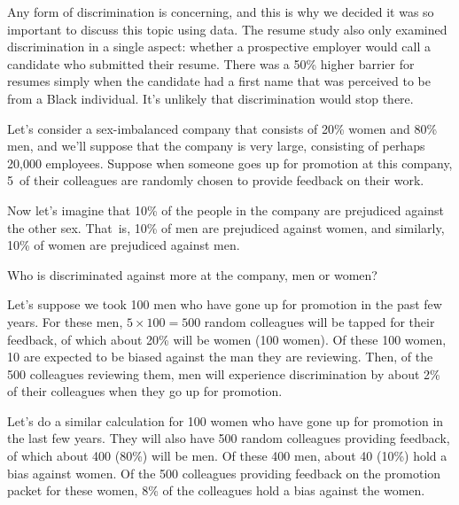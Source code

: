 Any form of discrimination is concerning,
and this is why we decided it was so important to discuss
this topic using data.
The resume study also only examined discrimination in a
single aspect: whether a prospective employer would
call a candidate who submitted their resume.
There was a 50\% higher barrier for resumes simply when
the candidate had a first name that was perceived to be
from a Black individual.
It's unlikely that discrimination would stop there.


\begin{examplewrap}
\begin{nexample}{Let's consider a sex-imbalanced
    company that consists of 20\% women
    and 80\% men,\footnotemark{}
    and we'll suppose that the
    company is very large, consisting of perhaps
    20,000 employees.
    Suppose when someone goes up for promotion at this
    company, 5~of their colleagues are randomly chosen
    to provide feedback on their work.
    \exspace{}

    Now let's imagine that 10\% of the people in the
    company are prejudiced against the other sex.
    That~is, 10\% of men are prejudiced against women,
    and similarly, 10\% of women are prejudiced against men.
    \exspace{}
    
    Who is discriminated against more at the company,
    men or women?}
  \label{sex_imbalance_leads_to_discrimination}%
  Let's suppose we took 100 men who have gone up for
  promotion in the past few years.
  For these men, $5 \times 100 = 500$ random colleagues
  will be tapped for their feedback, of which
  about 20\% will be women (100 women).
  Of these 100 women, 10 are expected to be biased
  against the man they are reviewing.
  Then, of the 500 colleagues reviewing them,
  men will experience
  discrimination by about 2\% of their colleagues when
  they go up for promotion.

  Let's do a similar calculation for 100 women
  who have gone up for promotion in the last few years.
  They will also have 500 random colleagues providing
  feedback, of which about 400 (80\%) will be men.
  Of these 400 men, about 40 (10\%) hold a bias against
  women.
  Of the 500 colleagues providing feedback on the
  promotion packet for these women, 8\% of the
  colleagues hold a bias against the women.
\end{nexample}
\end{examplewrap}

